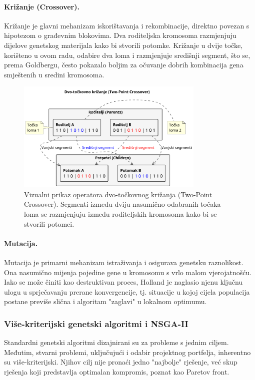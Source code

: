 \paragraph{Križanje (Crossover).} Križanje je glavni mehanizam iskorištavanja i rekombinacije, direktno povezan s hipotezom o građevnim blokovima. Dva roditeljska kromosoma razmjenjuju dijelove genetskog materijala kako bi stvorili potomke. Križanje u dvije točke, korišteno u ovom radu, odabire dva loma i razmjenjuje središnji segment, što se, prema Goldbergu, često pokazalo boljim za očuvanje dobrih kombinacija gena smještenih u sredini kromosoma.
\begin{figure}[H]
    \centering
    \includegraphics[width=0.8\textwidth]{slike/crossover_diagram.png}
    \caption{Vizualni prikaz operatora dvo-točkovnog križanja (Two-Point Crossover). Segmenti između dviju nasumično odabranih točaka loma se razmjenjuju između roditeljskih kromosoma kako bi se stvorili potomci.}
    \label{fig:crossover}
\end{figure}
\paragraph{Mutacija.} Mutacija je primarni mehanizam istraživanja i osigurava genetsku raznolikost. Ona nasumično mijenja pojedine gene u kromosomu s vrlo malom vjerojatnošću. Iako se može činiti kao destruktivan proces, Holland \cite{Holland1975} je naglasio njenu ključnu ulogu u sprječavanju prerane konvergencije, tj. situacije u kojoj cijela populacija postane previše slična i algoritam "zaglavi" u lokalnom optimumu.




\subsubsection{Više-kriterijski genetski algoritmi i NSGA-II}
\label{sec:NSGA-II}
Standardni genetski algoritmi dizajnirani su za probleme s jednim ciljem. Međutim, stvarni problemi, uključujući i odabir projektnog portfelja, inherentno su više-kriterijski. Njihov cilj nije pronaći jedno "najbolje" rješenje, već skup rješenja koji predstavlja optimalan kompromis, poznat kao Paretov front.

